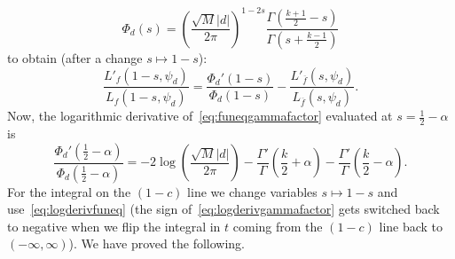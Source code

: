 \documentclass[11pt,reqno]{amsart} \usepackage{fullpage}
\newcommand\be{\begin{equation}}
\newcommand\ee{\end{equation}}
\newcommand{\gf}{\Phi_d}
\newcommand{\gfactor}[2][]{\gf#1\left(#2\right)}
\numberwithin{equation}{section}
\begin{document}
\be\label{eq:funeqgammafactor} \gfactor{s}=
\left(\frac{\sqrt M|d|}{2\pi}\right)^{1-2s}
\frac{\Gamma\left(\frac{k+1}2-s\right)}{\Gamma\left(s+\frac{k-1}2\right)}
\ee
to obtain (after a change $s\mapsto1-s$):
\be\label{eq:logderivfuneq} \frac{L'_f(1-s,\psi_d)}{L_f(1-s,\psi_d)} =
\frac{\gfactor[']{1-s}}{\gfactor{1-s}}
- \frac{L'_{\overline f}(s,\psi_d)}{L_{\overline f}(s,\psi_d)}. \ee
Now, the logarithmic derivative of~\eqref{eq:funeqgammafactor} evaluated at
$s=\tfrac12-\alpha$ is
\be\label{eq:logderivgammafactor}
\frac{\gfactor[']{\frac12-\alpha}}{\gfactor{\frac12-\alpha}}
=
-2\log\left(\frac{\sqrt M|d|}{2\pi}\right)
-\frac{\Gamma'}{\Gamma}\left(\frac k2+\alpha\right)
-\frac{\Gamma'}{\Gamma}\left(\frac k2-\alpha\right).
\ee
For the integral on the $(1-c)$ line we change variables $s\mapsto1-s$ and
use~\eqref{eq:logderivfuneq} (the sign of~\eqref{eq:logderivgammafactor} gets
switched back to negative when we flip the integral in $t$ coming from the
$(1-c)$ line back to $(-\infty,\infty)$). We have proved the following.
\end{document}
